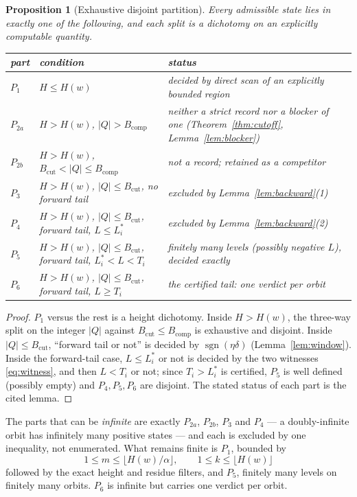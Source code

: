 \documentclass[11pt]{article}
\newtheorem{proposition}[theorem]{Proposition}
\theoremstyle{definition}
\theoremstyle{remark}
\newcommand{\dd}{\delta}
\newcommand{\sgn}{\operatorname{sgn}}
\begin{document}
\begin{proposition}[Exhaustive disjoint partition]\label{prop:partition}
Every admissible state lies in exactly one of the following, and each split is a dichotomy on an
explicitly computable quantity.
\begin{center}\small
\begin{tabular}{@{}llp{7.4cm}@{}}
\toprule
part & condition & status \\
\midrule
$P_1$ & $H\le H(w)$ & decided by direct scan of an explicitly bounded region \\
$P_{2a}$ & $H>H(w)$, $|Q|>B_{\mathrm{comp}}$ & neither a strict record nor a blocker of one
  (Theorem~\ref{thm:cutoff}, Lemma~\ref{lem:blocker}) \\
$P_{2b}$ & $H>H(w)$, $B_{\mathrm{cut}}<|Q|\le B_{\mathrm{comp}}$ & not a record; retained as a
  competitor \\
$P_3$ & $H>H(w)$, $|Q|\le B_{\mathrm{cut}}$, no forward tail & excluded by
  Lemma~\ref{lem:backward}(1) \\
$P_4$ & $H>H(w)$, $|Q|\le B_{\mathrm{cut}}$, forward tail, $L\le L_i^{*}$ & excluded by
  Lemma~\ref{lem:backward}(2) \\
$P_5$ & $H>H(w)$, $|Q|\le B_{\mathrm{cut}}$, forward tail, $L_i^{*}<L<T_i$ & finitely many
  levels (possibly negative $L$), decided exactly \\
$P_6$ & $H>H(w)$, $|Q|\le B_{\mathrm{cut}}$, forward tail, $L\ge T_i$ & the certified tail: one
  verdict per orbit \\
\bottomrule
\end{tabular}
\end{center}
\end{proposition}

\begin{proof}
$P_1$ versus the rest is a height dichotomy. Inside $H>H(w)$, the three-way split on the
integer $|Q|$ against $B_{\mathrm{cut}}\le B_{\mathrm{comp}}$ is exhaustive and disjoint. Inside
$|Q|\le B_{\mathrm{cut}}$, ``forward tail or not'' is decided by $\sgn(\eta\dd)$
(Lemma~\ref{lem:window}). Inside the forward-tail case, $L\le L_i^{*}$ or not is decided by the
two witnesses \eqref{eq:witness}, and then $L<T_i$ or not; since $T_i>L_i^{*}$ is certified,
$P_5$ is well defined (possibly empty) and $P_4,P_5,P_6$ are disjoint. The stated status of each
part is the cited lemma.
\end{proof}

The parts that can be \emph{infinite} are exactly $P_{2a}$, $P_{2b}$, $P_3$ and $P_4$ --- a
doubly-infinite orbit has infinitely many positive states --- and each is excluded by one
inequality, not enumerated. What remains finite is $P_1$, bounded by
\begin{equation}\label{eq:P1box}
1\le m\le\bigl\lfloor H(w)/\alpha\bigr\rfloor,\qquad
1\le k\le\bigl\lfloor H(w)\bigr\rfloor
\end{equation}
followed by the exact height and residue filters, and $P_5$, finitely many levels on finitely
many orbits. $P_6$ is infinite but carries one verdict per orbit.
\end{document}
